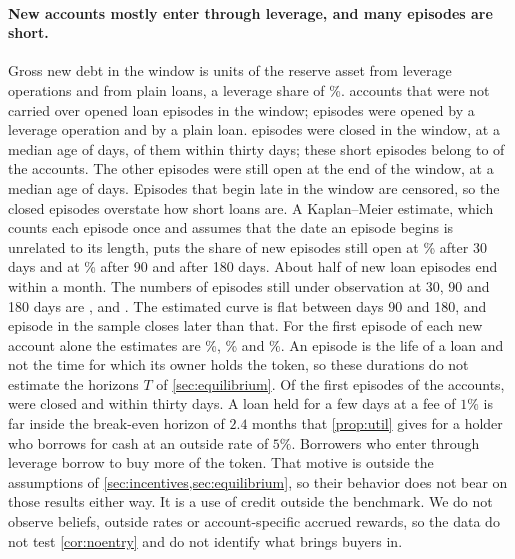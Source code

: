 \paragraph{New accounts mostly enter through leverage, and many episodes are short.} Gross new debt in the window is \EAmtLever{} units of the reserve asset from leverage operations and \EAmtBorrow{} from plain loans, a leverage share of \ELeverAmtPct\%. \ENewAccts{} accounts that were not carried over opened \EEpisodes{} loan episodes in the window; \EEpLeverage{} episodes were opened by a leverage operation and \EEpBorrow{} by a plain loan. \EEpClosed{} episodes were closed in the window, at a median age of \EEpMedianClose{} days, \EEpClosedThirty{} of them within thirty days; these short episodes belong to \EAcctsShort{} of the accounts. The other \EEpOpen{} episodes were still open at the end of the window, at a median age of \EEpMedianOpenAge{} days. Episodes that begin late in the window are censored, so the closed episodes overstate how short loans are. A Kaplan--Meier estimate, which counts each episode once and assumes that the date an episode begins is unrelated to its length, puts the share of new episodes still open at \EKMThirty\% after 30 days and at \EKMNinety\% after 90 and after 180 days. About half of new loan episodes end within a month. The numbers of episodes still under observation at 30, 90 and 180 days are \EKMRiskThirty, \EKMRiskNinety{} and \EKMRiskHalfYear. The estimated curve is flat between days 90 and 180, and \EKMLateCloses{} episode in the sample closes later than that. For the first episode of each new account alone the estimates are \EKMFirstThirty\%, \EKMFirstNinety\% and \EKMFirstHalfYear\%. An episode is the life of a loan and not the time for which its owner holds the token, so these durations do not estimate the horizons $T$ of \cref{sec:equilibrium}. Of the first episodes of the \ENewAccts{} accounts, \EFirstClosed{} were closed and \EFirstClosedThirty{} within thirty days. A loan held for a few days at a fee of $1\%$ is far inside the break-even horizon of $2.4$ months that \cref{prop:util} gives for a holder who borrows for cash at an outside rate of $5\%$. Borrowers who enter through leverage borrow to buy more of the token. That motive is outside the assumptions of \cref{sec:incentives,sec:equilibrium}, so their behavior does not bear on those results either way. It is a use of credit outside the benchmark. We do not observe beliefs, outside rates or account-specific accrued rewards, so the data do not test \cref{cor:noentry} and do not identify what brings buyers in.

